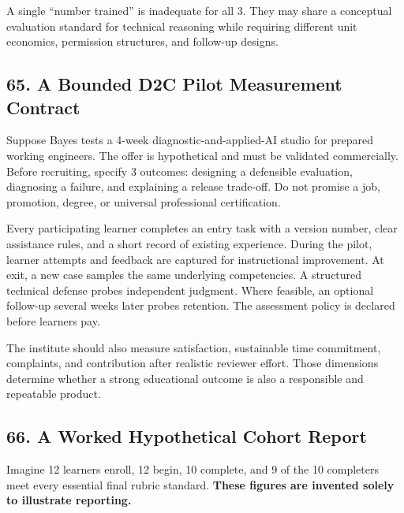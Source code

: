 A single ``number trained'' is inadequate for all 3. They may share a conceptual evaluation standard for technical reasoning while requiring different unit economics, permission structures, and follow-up designs.

\subsection*{65. A Bounded D2C Pilot Measurement Contract}

Suppose Bayes tests a 4-week diagnostic-and-applied-AI studio for prepared working engineers. The offer is hypothetical and must be validated commercially. Before recruiting, specify 3 outcomes: designing a defensible evaluation, diagnosing a failure, and explaining a release trade-off. Do not promise a job, promotion, degree, or universal professional certification.

Every participating learner completes an entry task with a version number, clear assistance rules, and a short record of existing experience. During the pilot, learner attempts and feedback are captured for instructional improvement. At exit, a new case samples the same underlying competencies. A structured technical defense probes independent judgment. Where feasible, an optional follow-up several weeks later probes retention. The assessment policy is declared before learners pay.

The institute should also measure satisfaction, sustainable time commitment, complaints, and contribution after realistic reviewer effort. Those dimensions determine whether a strong educational outcome is also a responsible and repeatable product.

\subsection*{66. A Worked Hypothetical Cohort Report}

Imagine 12 learners enroll, 12 begin, 10 complete, and 9 of the 10 completers meet every essential final rubric standard. \textbf{These figures are invented solely to illustrate reporting.}

